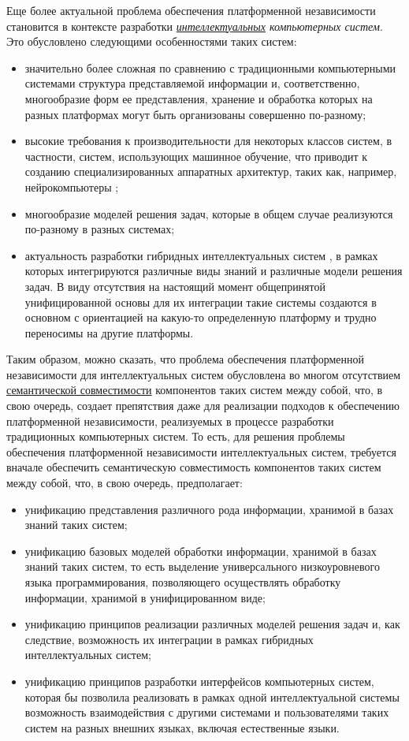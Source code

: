 Еще более актуальной проблема обеспечения платформенной независимости становится в контексте разработки \textit{\uline{интеллектуальных} компьютерных систем}. Это обусловлено следующими особенностями таких систем:
\begin{itemize}
	\item значительно более сложная по сравнению с традиционными компьютерными системами структура представляемой информации и, соответственно, многообразие форм ее представления, хранение и обработка которых на разных платформах могут быть организованы совершенно по-разному;
	\item высокие требования к производительности для некоторых классов систем, в частности, систем, использующих машинное обучение, что приводит к созданию специализированных аппаратных архитектур, таких как, например, нейрокомпьютеры \cite{Neurocomputers,USB_Accelerator};
	\item многообразие моделей решения задач, которые в общем случае реализуются по-разному в разных системах;
	\item актуальность разработки гибридных интеллектуальных систем \cite{Kolesnikov2001}, в рамках которых интегрируются различные виды знаний и различные модели решения задач. В виду отсутствия на настоящий момент общепринятой унифицированной основы для их интеграции такие системы создаются в основном с ориентацией на какую-то определенную платформу и трудно переносимы на другие платформы.
\end{itemize}

Таким образом, можно сказать, что проблема обеспечения платформенной независимости для интеллектуальных систем обусловлена во многом отсутствием \uline{семантической совместимости} компонентов таких систем между собой, что, в свою очередь, создает препятствия даже для реализации подходов к обеспечению платформенной независимости, реализуемых в процессе разработки традиционных компьютерных систем. То есть, для решения проблемы обеспечения платформенной независимости интеллектуальных систем, требуется вначале обеспечить семантическую совместимость компонентов таких систем между собой, что, в свою очередь, предполагает:
\begin{itemize}
	\item унификацию представления различного рода информации, хранимой в базах знаний таких систем;
	\item унификацию базовых моделей обработки информации, хранимой в базах знаний таких систем, то есть выделение универсального низкоуровневого языка программирования, позволяющего осуществлять обработку информации, хранимой в унифицированном виде;
	\item унификацию принципов реализации различных моделей решения задач и, как следствие, возможность их интеграции в рамках гибридных интеллектуальных систем;
	\item унификацию принципов разработки интерфейсов компьютерных систем, которая бы позволила реализовать в рамках одной интеллектуальной системы возможность взаимодействия с другими системами и пользователями таких систем на разных внешних языках, включая естественные языки.
\end{itemize}

